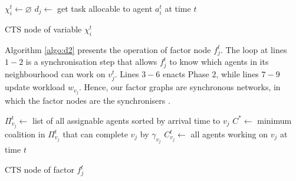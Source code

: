 \begin{algorithm}[t]
    \DontPrintSemicolon
    $\chi_i^t \gets \varnothing$ \;
    $d_j \gets$ get task allocable to agent $a_i^t$ at time $t$ \;
    \caption{CTS node of variable $\chi_i^t$\label{algo:d1}}
\end{algorithm}

Algorithm \ref{algo:d2} presents the operation of factor node $f_j^t$. The loop at lines
$1 - 2$ is a synchronisation step that allows $f_j^t$ to know which agents in its
neighbourhood can work on $v_j^t$. Lines $3 - 6$ enacts Phase $2$, while lines $7 - 9$
update workload $w_{v_j}$.
Hence, our factor graphs are synchronous networks, in which the factor nodes are the
synchronisers \cite{lynch1996}.

\begin{algorithm}[t]
    \DontPrintSemicolon
    $\Pi^t_{v_j} \gets$ list of all assignable agents sorted by arrival time to $v_j$\;
    $C^* \gets$ minimum coalition in $\Pi^t_{v_j}$ that can complete $v_j$ by $\gamma_{v_j}$
    \;
    $C^t_{v_j} \gets$ all agents working on $v_j$ at time $t$\;
    \caption{CTS node of factor $f_j^t$\label{algo:d2}}
\end{algorithm}

